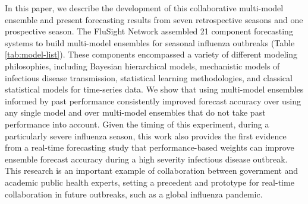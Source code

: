 \documentclass{article}\usepackage[]{graphicx}\usepackage[]{color}
\begin{document}
In this paper, we describe the development of this collaborative multi-model ensemble and present forecasting results from seven retrospective seasons and one prospective season.
The FluSight Network assembled 21 component forecasting systems to build multi-model ensembles for seasonal influenza outbreaks (Table \ref{tab:model-list}).
These components encompassed a variety of different modeling philosophies, including Bayesian hierarchical models, mechanistic models of infectious disease transmission, statistical learning methodologies, and classical statistical models for time-series data.
We show that using multi-model ensembles informed by past performance consistently improved forecast accuracy over using any single model and over multi-model ensembles that do not take past performance into account.
Given the timing of this experiment, during a particularly severe influenza season, this work also provides the first evidence from a real-time forecasting study that performance-based weights can improve ensemble forecast accuracy during a high severity infectious disease outbreak. 
This research is an important example of collaboration between government and academic public health experts, setting a precedent and prototype for real-time collaboration in future outbreaks, such as a global influenza pandemic.
\end{document}
